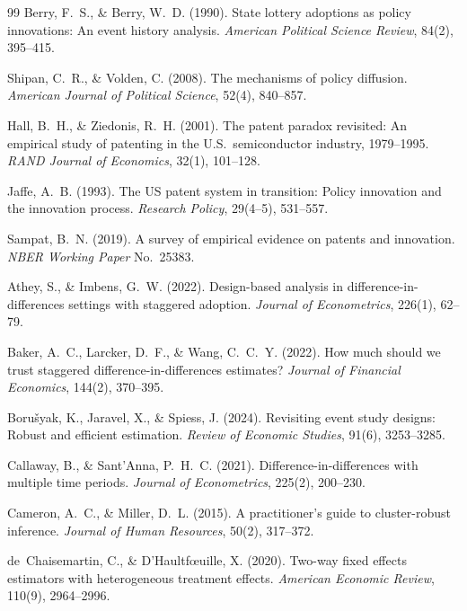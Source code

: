 \documentclass[12pt]{article}
\begin{document}
\begin{thebibliography}{99}
Berry, F.~S., \& Berry, W.~D. (1990). State lottery adoptions as policy innovations:
An event history analysis. \textit{American Political Science Review}, 84(2), 395--415.

Shipan, C.~R., \& Volden, C. (2008). The mechanisms of policy diffusion. \textit{American
Journal of Political Science}, 52(4), 840--857.

Hall, B.~H., \& Ziedonis, R.~H. (2001). The patent paradox revisited: An empirical
study of patenting in the U.S.\ semiconductor industry, 1979--1995. \textit{RAND Journal
of Economics}, 32(1), 101--128.

Jaffe, A.~B. (1993). The US patent system in transition: Policy innovation and the
innovation process. \textit{Research Policy}, 29(4--5), 531--557.

Sampat, B.~N. (2019). A survey of empirical evidence on patents and innovation.
\textit{NBER Working Paper} No.\ 25383.

Athey, S., \& Imbens, G.~W. (2022). Design-based analysis in difference-in-differences
settings with staggered adoption. \textit{Journal of Econometrics}, 226(1), 62--79.

Baker, A.~C., Larcker, D.~F., \& Wang, C.~C.~Y. (2022). How much should we trust
staggered difference-in-differences estimates? \textit{Journal of Financial Economics},
144(2), 370--395.

Boru\v{s}yak, K., Jaravel, X., \& Spiess, J. (2024). Revisiting event study designs:
Robust and efficient estimation. \textit{Review of Economic Studies}, 91(6), 3253--3285.

Callaway, B., \& Sant'Anna, P.~H.~C. (2021). Difference-in-differences with multiple
time periods. \textit{Journal of Econometrics}, 225(2), 200--230.

Cameron, A.~C., \& Miller, D.~L. (2015). A practitioner's guide to cluster-robust
inference. \textit{Journal of Human Resources}, 50(2), 317--372.

de~Chaisemartin, C., \& D'Haultf{\oe}uille, X. (2020). Two-way fixed effects estimators
with heterogeneous treatment effects. \textit{American Economic Review}, 110(9),
2964--2996.


\end{thebibliography}
\end{document}
